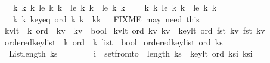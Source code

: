 \begin{isabellebody}
\ \ {\isacharparenleft}{\isacharbang}\ k{}\ k{}\ k{}{\isachardot}\ le\ k{}\ k{}\ {\isacharampersand}\ le\ k{}\ k{}\ {\isasymlongrightarrow}\ le\ k{}\ k{}{\isacharparenright}\ {\isacharampersand}\isanewline
\ \ {\isacharparenleft}{\isacharbang}\ k{}\ k{}{\isachardot}\ le\ k{}\ k{}\ {\isacharbar}\ le\ k{}\ k{}{\isacharparenright}\ {\isacharampersand}\isanewline
\ \ {\isacharparenleft}{\isacharbang}\ k{}\ k{}{\isachardot}\ key{\isacharunderscore}eq\ ord\ k{}\ k{}\ {\isasymlongrightarrow}\ {\isacharparenleft}k{}{\isacharequal}k{}{\isacharparenright}{\isacharparenright}\ \ {\isacharparenleft}{\isacharasterisk}\ FIXME\ may\ need\ this{\isacharquery}\ {\isacharasterisk}{\isacharparenright}\isanewline
{\isacharparenright}{\isachardoublequoteclose}\isanewline
\isanewline
\isanewline
{}\isamarkupfalse%
\ kv{\isacharunderscore}lt\ {\isacharcolon}{\isacharcolon}\ {\isachardoublequoteopen}{\isacharprime}k\ ord\ {\isasymRightarrow}\ {\isacharparenleft}{\isacharprime}k{\isacharasterisk}{\isacharprime}v{\isacharparenright}\ {\isasymRightarrow}\ {\isacharparenleft}{\isacharprime}k{\isacharasterisk}{\isacharprime}v{\isacharparenright}\ {\isasymRightarrow}\ bool{\isachardoublequoteclose}\ \isanewline
{\isachardoublequoteopen}kv{\isacharunderscore}lt\ ord\ kv{}\ kv{}\ {\isacharequal}\ {\isacharparenleft}key{\isacharunderscore}lt\ ord\ {\isacharparenleft}fst\ kv{}{\isacharparenright}\ {\isacharparenleft}fst\ kv{}{\isacharparenright}{\isacharparenright}{\isachardoublequoteclose}\isanewline
\isanewline
\isanewline
\isanewline
\isanewline
\isanewline
{}\isamarkupfalse%
\ ordered{\isacharunderscore}key{\isacharunderscore}list\ {\isacharcolon}{\isacharcolon}\ {\isachardoublequoteopen}{\isacharprime}k\ ord\ {\isasymRightarrow}\ {\isacharprime}k\ list\ {\isasymRightarrow}\ bool{\isachardoublequoteclose}\ \isanewline
{\isachardoublequoteopen}ordered{\isacharunderscore}key{\isacharunderscore}list\ ord\ ks\ {\isacharequal}\ {\isacharparenleft}\isanewline
\ \ {\isacharparenleft}List{\isachardot}length\ ks\ {\isacharless}\ {}{\isacharparenright}\ {\isacharbar}\ \ \isanewline
\ \ {\isacharparenleft}{\isacharbang}\ i\ {\isacharcolon}\ set{\isacharparenleft}from{\isacharunderscore}to\ {}\ {\isacharparenleft}length\ ks\ {\isacharminus}{}{\isacharparenright}{\isacharparenright}{\isachardot}\ key{\isacharunderscore}lt\ ord\ {\isacharparenleft}ks{\isacharbang}i{\isacharparenright}\ {\isacharparenleft}ks{\isacharbang}{\isacharparenleft}i{\isacharplus}{}{\isacharparenright}{\isacharparenright}{\isacharparenright}{\isacharparenright}{\isachardoublequoteclose}\isanewline

\end{isabellebody}
